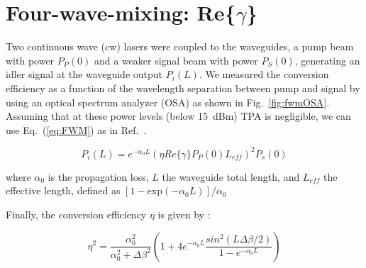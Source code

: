 \documentclass[10pt,letterpaper]{article}
\begin{document}

\section{Four-wave-mixing: Re\{$ \gamma $\}}
Two continuous wave (cw) lasers were coupled to the waveguides, a pump beam with power $P_P(0)$ and a weaker signal beam with power $P_S(0)$, generating an idler signal at the waveguide output $P_i(L)$. We measured the conversion efficiency as a function of the wavelength separation between pump and signal by using an optical spectrum analyzer (OSA) as shown in Fig.~\ref{fig:fwmOSA}. Assuming that at these power levels (below 15~dBm) TPA is negligible, we can use Eq.~(\ref{eq:FWM}) as in Ref.~\cite{Vallaitis2009}.







\begin{equation}
        P_i(L)=e^{-\alpha_0L}(\eta Re\{\gamma\}P_P(0)L_{eff})^2 P_s(0)
\label{eq:FWM}
\end{equation}


where $\alpha_0$ is the propagation loss, $L$ the waveguide total length, and $ L_{eff} $ the effective length, defined as $[ 1-\mathrm{exp}(-\alpha_0 L)] / \alpha_0 $


Finally, the conversion efficiency $\eta$ is given by \cite{Kung2003,Systems2004}:

\begin{equation}
        \eta ^2=\frac{\alpha_0^2}{\alpha_0^2+\Delta \beta^2}\left( 1+ 4e^{-\alpha_0L}\frac{sin^2(L\Delta\beta/2)}{1-e^{-\alpha_0L}} \right)
\end{equation}
\end{document}
